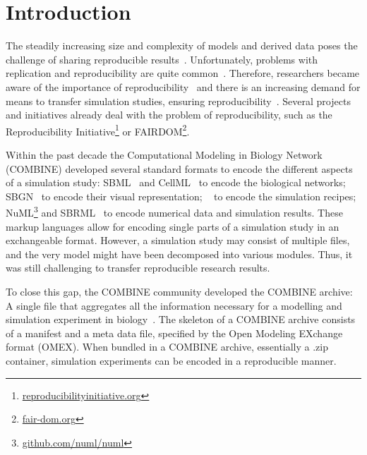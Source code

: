 
\section{Introduction}
\label{sec:intro}

The steadily increasing size and complexity of models and derived data poses the challenge of sharing reproducible results~\cite{scharm2014}.
Unfortunately, problems with replication and reproducibility are quite common~\cite{Prinz2011,repmicro,drugdevprob}.
Therefore, researchers became aware of the importance of reproducibility~\cite{Sandve2013} and
there is an increasing demand for means to transfer simulation studies, ensuring reproducibility~\cite{workflowobjects,researchobjects,Bergmann2014}.
% 
% 
% 
Several projects and initiatives already deal with the problem of reproducibility, such as the Reproducibility Initiative\footnote{\href{http://reproducibilityinitiative.org/}{reproducibilityinitiative.org}} or FAIRDOM\footnote{\href{http://fair-dom.org/}{fair-dom.org}}.

Within the past decade the Computational Modeling in Biology Network (COMBINE) developed several standard formats to encode the different aspects of a simulation study: SBML~\cite{Hucka2003} and CellML~\cite{Cuellar2003a} to encode the biological networks; SBGN~\cite{sbgn} to encode their visual representation; \sedml~\cite{Waltemath2011} to encode the simulation recipes; NuML\footnote{\href{https://github.com/numl/numl}{github.com/numl/numl}} and SBRML~\cite{Dada2010} to encode numerical data and simulation results.
These markup languages allow for encoding single parts of a simulation study in an exchangeable format.
However, a simulation study may consist of multiple files, and the very model might have been decomposed into various modules.
Thus, it was still challenging to transfer reproducible research results.

To close this gap, the COMBINE community developed the COMBINE archive:
A single file that aggregates all the information necessary for a modelling and simulation experiment in biology~\cite{Bergmann2014}.
The skeleton of a COMBINE archive consists of a manifest and a meta data file, specified by the Open Modeling EXchange format (OMEX).
When bundled in a COMBINE archive, essentially a .zip container, simulation experiments can be encoded in a reproducible manner. %

